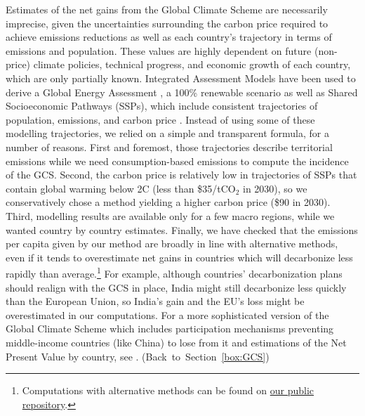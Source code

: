 Estimates of the net gains from the Global Climate Scheme are necessarily imprecise, given the uncertainties surrounding the carbon price required to achieve emissions reductions as well as each country's trajectory in terms of emissions and population. These values are highly dependent on future (non-price) climate policies, technical progress, and economic growth of each country, which are only partially known. Integrated Assessment Models have been used to derive a Global Energy Assessment , a 100\% renewable scenario  as well as Shared Socioeconomic Pathways (SSPs), which include consistent trajectories of population, emissions, and carbon price . Instead of using some of these modelling trajectories, we relied on a simple and transparent formula, for a number of reasons. First and foremost, those trajectories describe territorial emissions while we need consumption-based emissions to compute the incidence of the GCS. Second, the carbon price is relatively low in trajectories of SSPs that contain global warming below 2\textdegree{}C (less than \$35/tCO$_\text{2}$ in 2030), so we conservatively chose a method yielding a higher carbon price (\$90 in 2030). Third, modelling results are available only for a few macro regions, while we wanted country by country estimates. Finally, we have checked that the emissions per capita given by our method are broadly in line with alternative methods, even if it tends to overestimate net gains in countries which will decarbonize less rapidly than average.\footnote{Computations with alternative methods can be found on \href{https://github.com/bixiou/international_attitudes_toward_global_policies/blob/main/code_global/map_GCS_incidence.R}{our public repository}.} For example, although countries' decarbonization plans should realign with the GCS in place, India might still decarbonize less quickly than the European Union, so India's gain and the EU's loss might be overestimated in our computations. For a more sophisticated version of the Global Climate Scheme which includes participation mechanisms preventing middle-income countries (like China) to lose from it and estimations of the Net Present Value by country, see .  \hfill (Back~to~Section~\ref{box:GCS})

